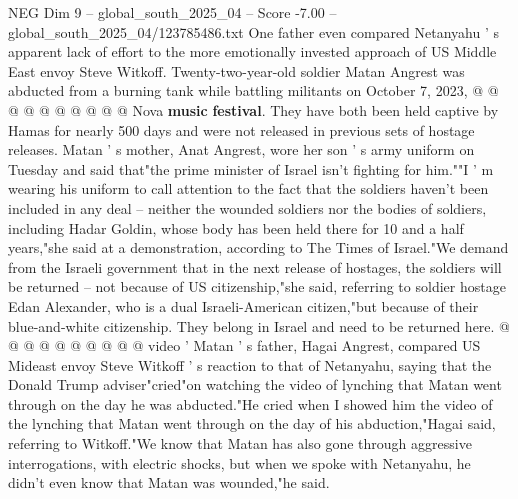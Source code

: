 \begin{textsample}{NEG Dim 9 – global\_south\_2025\_04 – Score -7.00 – global\_south\_2025\_04/123785486.txt}
One father even compared Netanyahu ' s apparent lack of effort to the more emotionally invested approach of US Middle East envoy Steve Witkoff.
Twenty-two-year-old soldier Matan Angrest was abducted from a burning tank while battling militants on October 7, 2023, @ @ @ @ @ @ @ @ @ @ Nova \textbf{music} \textbf{festival}.
They have both been held captive by Hamas for nearly 500 days and were not released in previous sets of hostage releases.
Matan ' s mother, Anat Angrest, wore her son ' s army uniform on Tuesday and said that"the prime minister of Israel isn't fighting for him.""I ' m wearing his uniform to call attention to the fact that the soldiers haven't been included in any deal -- neither the wounded soldiers nor the bodies of soldiers, including Hadar Goldin, whose body has been held there for 10 and a half years,"she said at a demonstration, according to The Times of Israel."We demand from the Israeli government that in the next release of hostages, the soldiers will be returned -- not because of US citizenship,"she said, referring to soldier hostage Edan Alexander, who is a dual Israeli-American citizen,"but because of their blue-and-white citizenship.
They belong in Israel and need to be returned here. @ @ @ @ @ @ @ @ @ @ video ' Matan ' s father, Hagai Angrest, compared US Mideast envoy Steve Witkoff ' s reaction to that of Netanyahu, saying that the Donald Trump adviser"cried"on watching the video of lynching that Matan went through on the day he was abducted."He cried when I showed him the video of the lynching that Matan went through on the day of his abduction,"Hagai said, referring to Witkoff."We know that Matan has also gone through aggressive interrogations, with electric shocks, but when we spoke with Netanyahu, he didn't even know that Matan was wounded,"he said.

\end{textsample}
